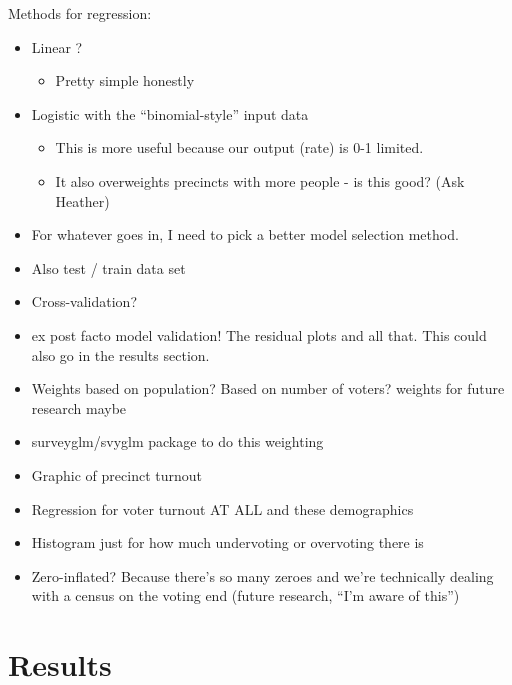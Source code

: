 \documentclass[12pt,twoside]{reedthesis}
\providecommand{\tightlist}{%
  \setlength{\itemsep}{0pt}\setlength{\parskip}{0pt}}
\theoremstyle{definition}
\theoremstyle{definition}
\theoremstyle{definition}
\theoremstyle{remark}
\begin{document}
Methods for regression:
\begin{itemize}
\tightlist
\item
  Linear ?
  \begin{itemize}
  \tightlist
  \item
    Pretty simple honestly
  \end{itemize}
\item
  Logistic with the ``binomial-style'' input data
  \begin{itemize}
  \tightlist
  \item
    This is more useful because our output (rate) is 0-1 limited.
  \item
    It also overweights precincts with more people - is this good? (Ask
    Heather)
  \end{itemize}
\item
  For whatever goes in, I need to pick a better model selection method.
\item
  Also test / train data set
\item
  Cross-validation?
\item
  ex post facto model validation! The residual plots and all that. This
  could also go in the results section.
\item
  Weights based on population? Based on number of voters? weights for
  future research maybe
\item
  surveyglm/svyglm package to do this weighting
\item
  Graphic of precinct turnout
\item
  Regression for voter turnout AT ALL and these demographics
\item
  Histogram just for how much undervoting or overvoting there is
\item
  Zero-inflated? Because there's so many zeroes and we're technically
  dealing with a census on the voting end (future research, ``I'm aware
  of this'')
\end{itemize}
\hypertarget{results}{%
\chapter{Results}\label{results}}
\end{document}
